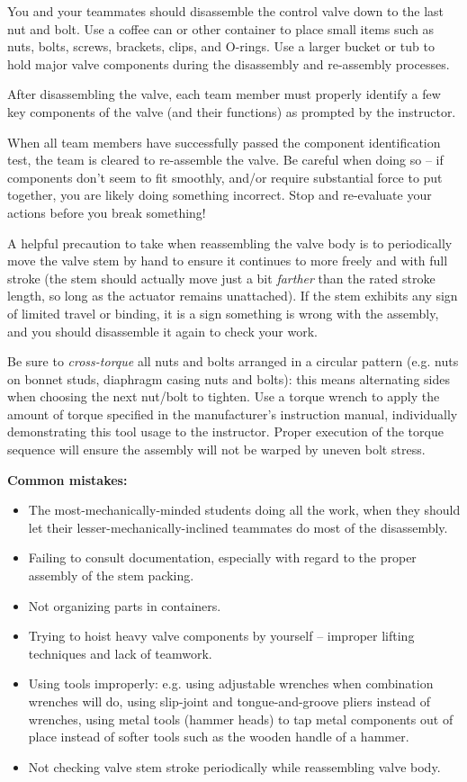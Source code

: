 You and your teammates should disassemble the control valve down to the last nut and bolt.  Use a coffee can or other container to place small items such as nuts, bolts, screws, brackets, clips, and O-rings.  Use a larger bucket or tub to hold major valve components during the disassembly and re-assembly processes.

\vskip 10pt

After disassembling the valve, each team member must properly identify a few key components of the valve (and their functions) as prompted by the instructor.

\vskip 10pt

When all team members have successfully passed the component identification test, the team is cleared to re-assemble the valve.  Be careful when doing so -- if components don't seem to fit smoothly, and/or require substantial force to put together, you are likely doing something incorrect.  Stop and re-evaluate your actions before you break something!

A helpful precaution to take when reassembling the valve body is to periodically move the valve stem by hand to ensure it continues to more freely and with full stroke (the stem should actually move just a bit {\it farther} than the rated stroke length, so long as the actuator remains unattached).  If the stem exhibits any sign of limited travel or binding, it is a sign something is wrong with the assembly, and you should disassemble it again to check your work.

Be sure to {\it cross-torque} all nuts and bolts arranged in a circular pattern (e.g. nuts on bonnet studs, diaphragm casing nuts and bolts): this means alternating sides when choosing the next nut/bolt to tighten.  Use a torque wrench to apply the amount of torque specified in the manufacturer's instruction manual, individually demonstrating this tool usage to the instructor.  Proper execution of the torque sequence will ensure the assembly will not be warped by uneven bolt stress.

\vskip 10pt

{\bf Common mistakes:}

\begin{itemize}
\item The most-mechanically-minded students doing all the work, when they should let their lesser-mechanically-inclined teammates do most of the disassembly.
\item Failing to consult documentation, especially with regard to the proper assembly of the stem packing.
\item Not organizing parts in containers.
\item Trying to hoist heavy valve components by yourself -- improper lifting techniques and lack of teamwork.
\item Using tools improperly: e.g. using adjustable wrenches when combination wrenches will do, using slip-joint and tongue-and-groove pliers instead of wrenches, using metal tools (hammer heads) to tap metal components out of place instead of softer tools such as the wooden handle of a hammer.
\item Not checking valve stem stroke periodically while reassembling valve body.
\end{itemize}

